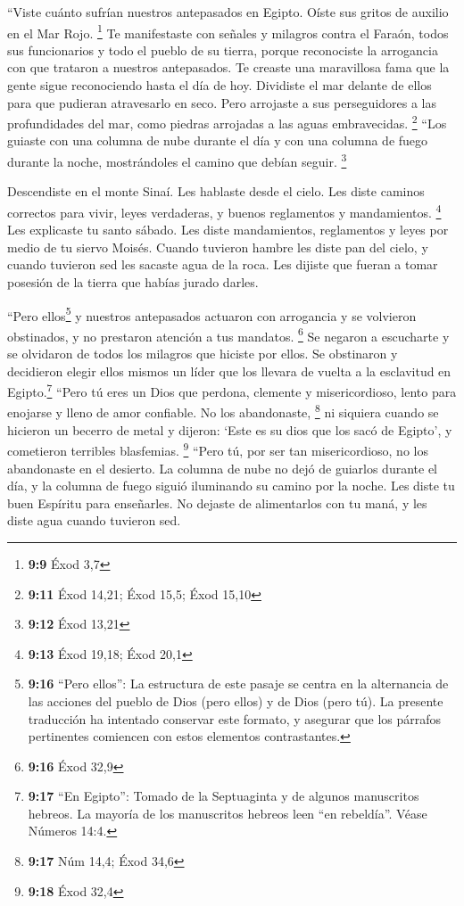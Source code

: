  ``Viste cuánto sufrían nuestros antepasados en Egipto.
Oíste sus gritos de auxilio en el Mar Rojo. \footnote{\textbf{9:9} Éxod
  3,7}  Te manifestaste con señales y milagros contra el
Faraón, todos sus funcionarios y todo el pueblo de su tierra, porque
reconociste la arrogancia con que trataron a nuestros antepasados. Te
creaste una maravillosa fama que la gente sigue reconociendo hasta el
día de hoy.  Dividiste el mar delante de ellos para que
pudieran atravesarlo en seco. Pero arrojaste a sus perseguidores a las
profundidades del mar, como piedras arrojadas a las aguas embravecidas.
\footnote{\textbf{9:11} Éxod 14,21; Éxod 15,5; Éxod 15,10}
 ``Los guiaste con una columna de nube durante el día y
con una columna de fuego durante la noche, mostrándoles el camino que
debían seguir. \footnote{\textbf{9:12} Éxod 13,21}

 Descendiste en el monte Sinaí. Les hablaste desde el
cielo. Les diste caminos correctos para vivir, leyes verdaderas, y
buenos reglamentos y mandamientos. \footnote{\textbf{9:13} Éxod 19,18;
  Éxod 20,1}  Les explicaste tu santo sábado. Les diste
mandamientos, reglamentos y leyes por medio de tu siervo Moisés.
 Cuando tuvieron hambre les diste pan del cielo, y cuando
tuvieron sed les sacaste agua de la roca. Les dijiste que fueran a tomar
posesión de la tierra que habías jurado darles.

 ``Pero ellos\footnote{\textbf{9:16} ``Pero ellos'': La
  estructura de este pasaje se centra en la alternancia de las acciones
  del pueblo de Dios (pero ellos) y de Dios (pero tú). La presente
  traducción ha intentado conservar este formato, y asegurar que los
  párrafos pertinentes comiencen con estos elementos contrastantes.} y
nuestros antepasados actuaron con arrogancia y se volvieron obstinados,
y no prestaron atención a tus mandatos. \footnote{\textbf{9:16} Éxod
  32,9}  Se negaron a escucharte y se olvidaron de todos
los milagros que hiciste por ellos. Se obstinaron y decidieron elegir
ellos mismos un líder que los llevara de vuelta a la esclavitud en
Egipto.\footnote{\textbf{9:17} ``En Egipto'': Tomado de la Septuaginta y
  de algunos manuscritos hebreos. La mayoría de los manuscritos hebreos
  leen ``en rebeldía''. Véase Números 14:4.} ``Pero tú eres un Dios que
perdona, clemente y misericordioso, lento para enojarse y lleno de amor
confiable. No los abandonaste, \footnote{\textbf{9:17} Núm 14,4; Éxod
  34,6}  ni siquiera cuando se hicieron un becerro de
metal y dijeron: `Este es su dios que los sacó de Egipto', y cometieron
terribles blasfemias. \footnote{\textbf{9:18} Éxod 32,4} 
``Pero tú, por ser tan misericordioso, no los abandonaste en el
desierto. La columna de nube no dejó de guiarlos durante el día, y la
columna de fuego siguió iluminando su camino por la noche.
 Les diste tu buen Espíritu para enseñarles. No dejaste
de alimentarlos con tu maná, y les diste agua cuando tuvieron sed.

